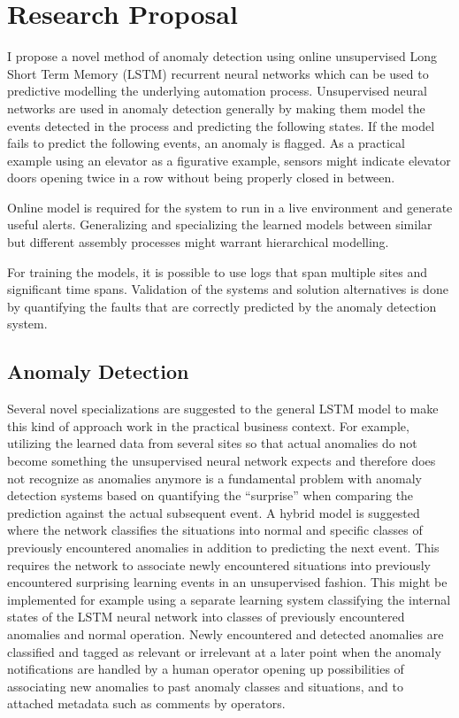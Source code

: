 \documentclass[a4paper,10pt]{article}
\begin{document}
\section{Research Proposal}

I propose a novel method of anomaly detection using online unsupervised Long Short Term Memory (LSTM)\cite{LSTM} recurrent neural networks which can be used to predictive
modelling the underlying automation process. Unsupervised neural networks are used in anomaly detection generally by making them model the events detected
in the process and predicting the following states. If the model fails to predict the following events, an anomaly is flagged.
As a practical example using an elevator as a figurative example, sensors might indicate elevator doors opening twice in a row without being properly closed in between.

Online model is required for the system to run in a live environment and generate useful alerts. Generalizing and specializing the learned models between similar but
different assembly processes might warrant hierarchical modelling.

For training the models, it is possible to use logs that span multiple sites and significant time spans. Validation of the systems and solution alternatives is done by quantifying
the faults that are correctly predicted by the anomaly detection system. 

\subsection{Anomaly Detection}

Several novel specializations are suggested to the general LSTM model to make this kind of approach work in the practical business context.
For example, utilizing the learned data from several sites so that actual anomalies do not become something the unsupervised neural network expects and therefore
does not recognize as anomalies anymore is a fundamental problem with anomaly detection systems based on quantifying the ``surprise'' when comparing the prediction against
the actual subsequent event. A hybrid model is suggested where the network classifies the situations into normal and specific classes
of previously encountered anomalies in addition to predicting the next event. This requires the network to associate newly encountered situations into previously
encountered surprising learning events in an unsupervised fashion. This might be implemented for example using a separate learning system classifying the internal
states of the LSTM neural network into classes of previously encountered anomalies and normal operation.
Newly encountered and detected anomalies are classified and tagged as relevant or irrelevant at a later point when the anomaly notifications are handled
by a human operator opening up possibilities of associating new anomalies to past anomaly classes and situations, and to attached metadata such as comments by operators.
\end{document}
